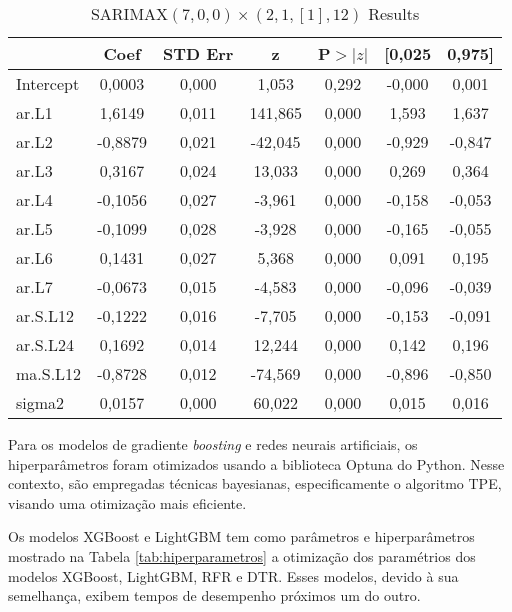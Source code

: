 \begin{table}[!htb]
	\centering
	\caption{SARIMAX$(7, 0, 0)\times(2, 1, [1], 12)$ Results} \label{tb:resltsar}
	\begin{tabular}{
			l
			S[table-format=1.4]
			S[table-format=1.4]
			S[table-format=3.3]
			S[table-format=1.3]
			S[table-format=1.3]
			S[table-format=1.3]
		}
		\toprule
		& {Coef} & {STD Err} & {z} & {P$>|z|$} & {[0,025} & {0,975]} \\
		\midrule
		Intercept & 0,0003 & 0,000 & 1,053 & 0,292 & -0,000 & 0,001 \\
		ar.L1 & 1,6149 & 0,011 & 141,865 & 0,000 & 1,593 & 1,637 \\
		ar.L2 & -0,8879 & 0,021 & -42,045 & 0,000 & -0,929 & -0,847 \\
		ar.L3 & 0,3167 & 0,024 & 13,033 & 0,000 & 0,269 & 0,364 \\
		ar.L4 & -0,1056 & 0,027 & -3,961 & 0,000 & -0,158 & -0,053 \\
		ar.L5 & -0,1099 & 0,028 & -3,928 & 0,000 & -0,165 & -0,055 \\
		ar.L6 & 0,1431 & 0,027 & 5,368 & 0,000 & 0,091 & 0,195 \\
		ar.L7 & -0,0673 & 0,015 & -4,583 & 0,000 & -0,096 & -0,039 \\
		ar.S.L12 & -0,1222 & 0,016 & -7,705 & 0,000 & -0,153 & -0,091 \\
		ar.S.L24 & 0,1692 & 0,014 & 12,244 & 0,000 & 0,142 & 0,196 \\
		ma.S.L12 & -0,8728 & 0,012 & -74,569 & 0,000 & -0,896 & -0,850 \\
		sigma2 & 0,0157 & 0,000 & 60,022 & 0,000 & 0,015 & 0,016 \\
		\bottomrule
	\end{tabular}
\end{table}


Para os modelos de gradiente \textit{boosting} e redes neurais artificiais, os hiperparâmetros foram otimizados usando a biblioteca Optuna do Python. Nesse contexto, são empregadas técnicas bayesianas, especificamente o algoritmo TPE, visando uma otimização mais eficiente.

Os modelos XGBoost e LightGBM tem como parâmetros e hiperparâmetros mostrado na Tabela \ref{tab:hiperparametros} a otimização dos paramétrios dos modelos XGBoost, LightGBM, RFR e DTR. Esses modelos, devido à sua semelhança, exibem tempos de desempenho próximos um do outro. 



